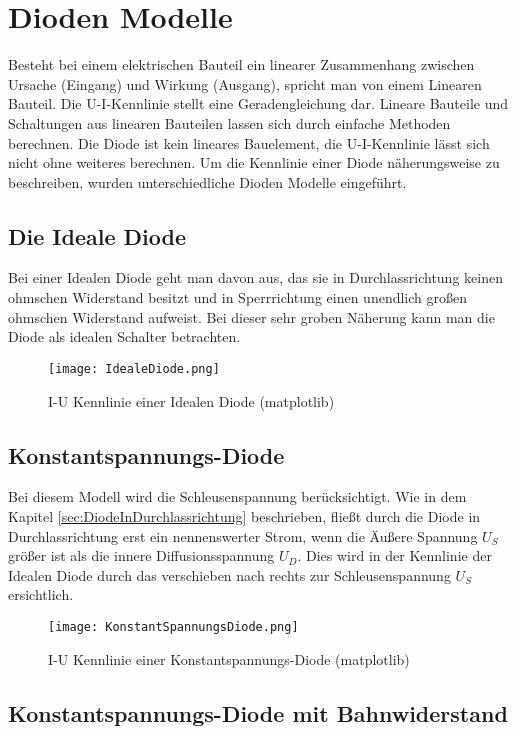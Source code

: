 \chapter{Dioden Modelle }
Besteht bei einem elektrischen Bauteil ein linearer Zusammenhang zwischen Ursache (Eingang) und Wirkung (Ausgang), spricht man von einem Linearen Bauteil. Die  U-I-Kennlinie stellt eine Geradengleichung dar. Lineare Bauteile und Schaltungen aus linearen Bauteilen lassen sich durch einfache Methoden berechnen. 
Die Diode ist kein lineares Bauelement, die U-I-Kennlinie lässt sich nicht ohne weiteres berechnen. Um die Kennlinie einer Diode näherungsweise zu beschreiben, wurden unterschiedliche Dioden Modelle eingeführt. 

\section{Die Ideale Diode}
Bei einer Idealen Diode geht man davon aus, das sie in Durchlassrichtung keinen ohmschen Widerstand besitzt und in Sperrrichtung einen unendlich großen ohmschen Widerstand aufweist. Bei dieser sehr groben Näherung kann man die Diode als idealen Schalter betrachten.

\begin{figure}[!htb]
\centering
\texttt{[image: IdealeDiode.png]}
\caption{I-U Kennlinie einer Idealen Diode (matplotlib)}
\end{figure}

\section{Konstantspannungs-Diode}
Bei diesem Modell wird die Schleusenspannung berücksichtigt. Wie in dem Kapitel \ref{sec:DiodeInDurchlassrichtung} beschrieben, fließt durch die Diode in Durchlassrichtung erst ein nennenswerter Strom, wenn die Äußere Spannung $U_{S}$ größer ist als die innere Diffusionsspannung $U_{D}$. Dies wird in der Kennlinie der Idealen Diode durch das verschieben nach rechts zur Schleusenspannung $U_{S}$ ersichtlich. 

\begin{figure}[!htb]
\centering
\texttt{[image: KonstantSpannungsDiode.png]}
\caption{I-U Kennlinie einer Konstantspannungs-Diode (matplotlib)}
\end{figure}



\section{Konstantspannungs-Diode mit Bahnwiderstand}

